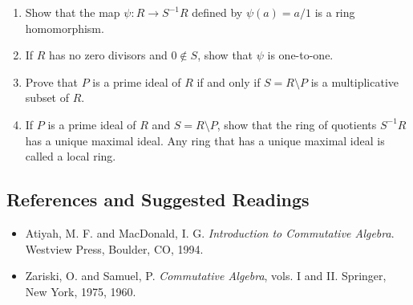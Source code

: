 {\begin{enumerate}
\begin{enumerate}
 
 \item
Show that the map $\psi : R \rightarrow S^{-1}R$ defined by $\psi(a)
= a/1$ is a ring homomorphism.
 
 \item
If $R$ has no zero divisors and $0 \notin S$, show that $\psi$ is
one-to-one.
 
 
\item
Prove that $P$ is a prime ideal of $R$ if and only if $S = R \setminus
P$ is a multiplicative subset of $R$. 
 
\item
If $P$ is a prime ideal of $R$ and $S = R \setminus P$, show that the
ring of quotients $S^{-1}R$ has a unique maximal ideal. Any ring
that has a unique maximal ideal is called a {\bfi local
ring}.  
 
 
\end{enumerate}



 
\end{enumerate}
}
 
 
 
\subsection*{References and Suggested Readings}
 
{\small
 
\begin{itemize}
 
\item[{\bf [1]}] %
Atiyah, M. F.  and MacDonald, I. G. {\it Introduction to
Commutative Algebra}. Westview Press, Boulder, CO, 1994.
 


\item[{\bf [2]}] %
Zariski, O. and Samuel, P. {\it Commutative Algebra}, vols. I
and II. Springer, New York, 1975, 1960. 
 
\end{itemize}
}
 
\sagesection
 

